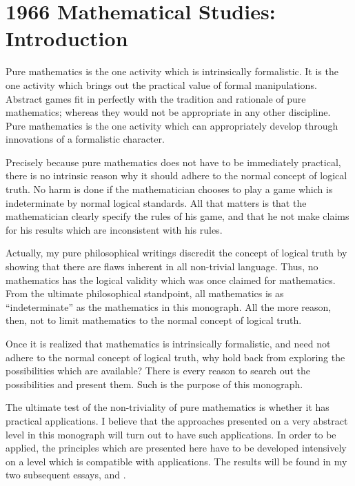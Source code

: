 \chapter{1966 Mathematical Studies: Introduction}

Pure mathematics is the one activity which is intrinsically formalistic. It 
is the one activity which brings out the practical value of formal 
manipulations. Abstract games fit in perfectly with the tradition and 
rationale of pure mathematics; whereas they would not be appropriate in 
any other discipline. Pure mathematics is the one activity which can 
appropriately develop through innovations of a formalistic character. 

Precisely because pure mathematics does not have to be immediately 
practical, there is no intrinsic reason why it should adhere to the normal 
concept of logical truth. No harm is done if the mathematician chooses to 
play a game which is indeterminate by normal logical standards. All that 
matters is that the mathematician clearly specify the rules of his game, and 
that he not make claims for his results which are inconsistent with his rules. 

Actually, my pure philosophical writings discredit the concept of 
logical truth by showing that there are flaws inherent in all non-trivial 
language. Thus, no mathematics has the logical validity which was once 
claimed for mathematics. From the ultimate philosophical standpoint, all 
mathematics is as \enquote{indeterminate} as the mathematics in this monograph. 
All the more reason, then, not to limit mathematics to the normal concept 
of logical truth. 

Once it is realized that mathematics is intrinsically formalistic, and need 
not adhere to the normal concept of logical truth, why hold back from 
exploring the possibilities which are available? There is every reason to 
search out the possibilities and present them. Such is the purpose of this 
monograph. 

The ultimate test of the non-triviality of pure mathematics is whether it 
has practical applications. I believe that the approaches presented on a very 
abstract level in this monograph will turn out to have such applications. In 
order to be applied, the principles which are presented here have to be 
developed intensively on a level which is compatible with applications. The 
results will be found in my two subsequent essays,  and .

